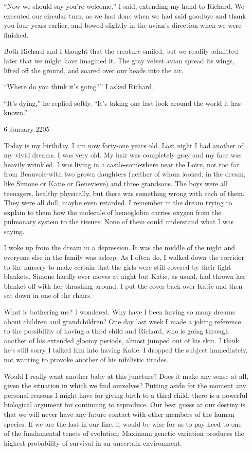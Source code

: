 \documentclass[]{article}
\begin{document}
“Now we should say you’re welcome,” I said, extending my hand to Richard. We executed our circular turn, as we had done when we had said goodbye and thank you four years earlier, and bowed slightly in the avian’s direction when we were finished.

Both Richard and I thought that the creature smiled, but we readily admitted later that we might have imagined it. The gray velvet avian spread its wings, lifted off the ground, and soared over our heads into the air.

“Where do you think it’s going?” I asked Richard.

“It’s dying,” he replied softly. “It’s taking one last look around the world it has known.”

6 January 2205

Today is my birthday. I am now forty-one years old. Last night I had another of my vivid dreams. I was very old. My hair was completely gray and my face was heavily wrinkled. I was living in a castle-somewhere near the Loire, not too far from Beauvois-with two grown daughters (neither of whom looked, in the dream, like Simone or Katie or Genevieve) and three grandsons. The boys were all teenagers, healthy physically, but there was something wrong with each of them. They were all dull, maybe even retarded. I remember in the dream trying to explain to them how the molecule of hemoglobin carries oxygen from the pulmonary system to the tissues. None of them could understand what I was saying.

I woke up from the dream in a depression. It was the middle of the night and everyone else in the family was asleep. As I often do, I walked down the corridor to the nursery to make certain that the girls were still covered by their light blankets. Simone hardly ever moves at night but Katie, as usual, had thrown her blanket off with her thrashing around. I put the cover back over Katie and then sat down in one of the chairs.

What is bothering me? I wondered. Why have I been having so many dreams about children and grandchildren? One day last week I made a joking reference to the possibility of having a third child and Richard, who is going through another of his extended gloomy periods, almost jumped out of his skin. I think he’s still sorry I talked him into having Katie. I dropped the subject immediately, not wanting to provoke another of his nihilistic tirades.

Would I really want another baby at this juncture? Does it make any sense at all, given the situation in which we find ourselves? Putting aside for the moment any personal reasons I might have for giving birth to a third child, there is a powerful biological argument for continuing to reproduce. Our best guess at our destiny is that we will never have any future contact with other members of the human species. If we are the last in our line, it would be wise for us to pay heed to one of the fundamental tenets of evolution: Maximum genetic variation produces the highest probability of survival in an uncertain environment.
\end{document}
